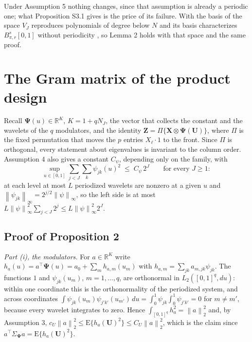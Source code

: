 \documentclass[10pt]{book}
\theoremstyle{definition}
\newcommand{\R}{\mathbb{R}}
\newcommand{\E}{\mathrm{E}}
\newcommand{\T}{^{\top}}
\newcommand{\norm}[1]{\left\lVert #1 \right\rVert}
\newcommand{\cv}{\ell}
\newcommand{\md}{m}
\newcommand{\lev}{j}
\newcommand{\tsl}{k}
\newcommand{\NJ}{N_{J}}
\newcommand{\bX}{\mathbf{X}}
\newcommand{\bU}{\mathbf{U}}
\newcommand{\bZ}{\mathbf{Z}}
\newcommand{\wav}[2]{\psi_{#1#2}}
\newcommand{\VJ}{V_{J}}
\newcommand{\Gram}{\Sigma}
\newcommand{\Besov}[3]{B^{#1}_{#2,#3}}
\newcommand{\bPsi}{\boldsymbol{\Psi}}
\begin{document}
Under Assumption 5 nothing changes, since that assumption is already a
periodic one; what Proposition S3.1 gives is the price of its failure. With
the basis of \citet*{cohen1993wavelets} the space $\VJ$ reproduces polynomials
of degree below $N$ and its basis characterizes $\Besov{s}{\pi}{r}[0,1]$
without periodicity \citep[Section 3.9]{Cohen-2003}, so Lemma 2 holds with
that space and the same proof.

\section{The Gram matrix of the product design}
\setcounter{equation}{0}

Recall $\bPsi(u) \in \R^{K}$, $K = 1+q\NJ$, the vector that collects the
constant and the wavelets of the $q$ modulators, and the identity
$\bZ = \Pi\{\bX \otimes \bPsi(\bU)\}$, where $\Pi$ is the fixed permutation
that moves the $p$ entries $X_{\cv}\cdot 1$ to the front. Since $\Pi$ is
orthogonal, every statement about eigenvalues is invariant to the column
order. Assumption 4 also gives a constant $C_\psi$, depending only on the
family, with
\begin{equation}
  \label{eq:pointwise}
  \sup_{u\in[0,1]}\sum_{\lev<J}\sum_{\tsl}\wav{\lev}{\tsl}(u)^2
  \;\le\; C_\psi\,2^{J} \qquad \text{for every } J \ge 1 :
\end{equation}
at each level at most $L$ periodized wavelets are nonzero at a given $u$ and
$\norm{\wav{\lev}{\tsl}}_{\infty} = 2^{\lev/2}\norm{\psi}_{\infty}$, so the
left side is at most
$L\norm{\psi}^2_{\infty}\sum_{\lev<J}2^{\lev} \le L\norm{\psi}^2_{\infty}2^J$.

\subsection*{Proof of Proposition 2}

\emph{Part (i), the modulators.} For $a \in \R^{K}$ write
$h_a(u) = a\T\bPsi(u) = a_0 + \sum_{\md}h_{a,\md}(u_{\md})$ with
$h_{a,\md} = \sum_{\lev\tsl}a_{\md,\lev\tsl}\wav{\lev}{\tsl}$. The functions
$1$ and $\wav{\lev}{\tsl}(u_{\md})$, $\md = 1,\dots,q$, are orthonormal in
$L_2([0,1]^q,du)$: within one coordinate this is the orthonormality of the
periodized system, and across coordinates
$\int\wav{\lev}{\tsl}(u_{\md})\wav{\lev'}{\tsl'}(u_{\md'})\,du =
\int_0^1\wav{\lev}{\tsl}\int_0^1\wav{\lev'}{\tsl'} = 0$ for
$\md \ne \md'$, because every wavelet integrates to zero. Hence
$\int_{[0,1]^q}h_a^2 = \norm{a}_2^2$ and, by Assumption 3,
$c_U\norm{a}_2^2 \le \E\{h_a(\bU)^2\} \le C_U\norm{a}_2^2$, which is the claim
since $a\T\Gram_{\bPsi}a = \E\{h_a(\bU)^2\}$.
\end{document}
